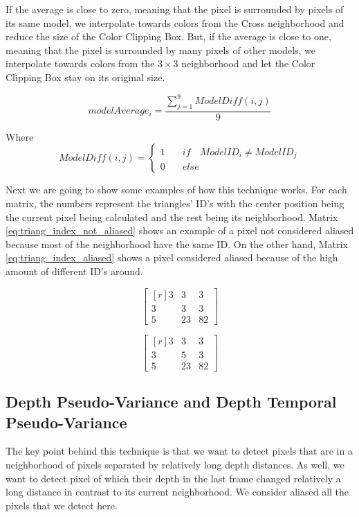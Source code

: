 \documentclass{cslthse-msc}
\begin{document}
If the average is close to zero, meaning that the pixel is surrounded by pixels of its same model, we interpolate towards colors from the Cross neighborhood and reduce the size of the Color Clipping Box. But, if the average is close to one, meaning that the pixel is surrounded by many pixels of other models, we interpolate towards colors from the $3\times 3$ neighborhood and let the Color Clipping Box stay on its original size.

\begin{equation}\label{eq:model_index_acc}
modelAverage_i = \frac{\sum\limits_{j=1}^{9} ModelDiff(i,j)}{9} 
\end{equation}

Where
\begin{equation*}
ModelDiff(i,j) = \left\lbrace \begin{split}1\quad & if\quad ModelID_i \neq ModelID_j \\ 0\quad & else\end{split} \right.
\end{equation*}

Next we are going to show some examples of how this technique works. For each matrix, the numbers represent the triangles' ID's with the center position being the current pixel being calculated and the rest being its neighborhood. Matrix \ref{eq:triang_index_not_aliased} shows an example of a pixel not considered aliased because most of the neighborhood have the same ID. On the other hand, Matrix \ref{eq:triang_index_aliased} shows a pixel considered aliased because of the high amount of different ID's around.

\begin{equation}
\begin{bmatrix*}[r]\label{eq:triang_index_not_aliased}
3 &  3 & 3 \\
3 &  3 & 3 \\
5 &  23 & 82
\end{bmatrix*}
\end{equation}

\begin{equation}
\begin{bmatrix*}[r]\label{eq:triang_index_aliased}
3 &  3 & 3 \\
3 &  5 & 3 \\
5 &  23 & 82
\end{bmatrix*}
\end{equation}

\subsection{Depth Pseudo-Variance and Depth Temporal Pseudo-Variance}
The key point behind this technique is that we want to detect pixels that are in a neighborhood of pixels separated by relatively long depth distances. As well, we want to detect pixel of which their depth in the last frame changed relatively a long distance in contrast to its current neighborhood. We consider aliased all the pixels that we detect here. 
\end{document}
